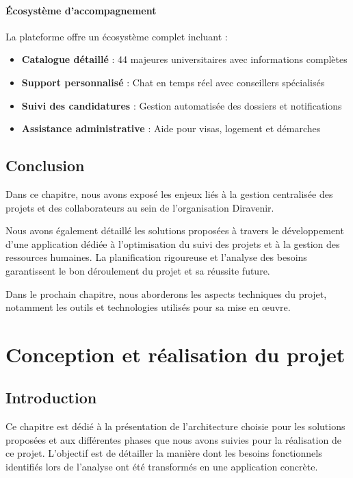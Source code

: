 \documentclass[12pt,a4paper]{report}
\begin{document}
\subsubsection{Écosystème d'accompagnement}

La plateforme offre un écosystème complet incluant :
\begin{itemize}
    \item \textbf{Catalogue détaillé} : 44 majeures universitaires avec informations complètes
    \item \textbf{Support personnalisé} : Chat en temps réel avec conseillers spécialisés
    \item \textbf{Suivi des candidatures} : Gestion automatisée des dossiers et notifications
    \item \textbf{Assistance administrative} : Aide pour visas, logement et démarches
\end{itemize}

\section{Conclusion}

Dans ce chapitre, nous avons exposé les enjeux liés à la gestion centralisée des projets et des collaborateurs au sein de l'organisation Diravenir. 

Nous avons également détaillé les solutions proposées à travers le développement d'une application dédiée à l'optimisation du suivi des projets et à la gestion des ressources humaines. La planification rigoureuse et l'analyse des besoins garantissent le bon déroulement du projet et sa réussite future.

Dans le prochain chapitre, nous aborderons les aspects techniques du projet, notamment les outils et technologies utilisés pour sa mise en œuvre.

\chapter{Conception et réalisation du projet}

\section{Introduction}

Ce chapitre est dédié à la présentation de l'architecture choisie pour les solutions proposées et aux différentes phases que nous avons suivies pour la réalisation de ce projet. L'objectif est de détailler la manière dont les besoins fonctionnels identifiés lors de l'analyse ont été transformés en une application concrète.
\end{document}
